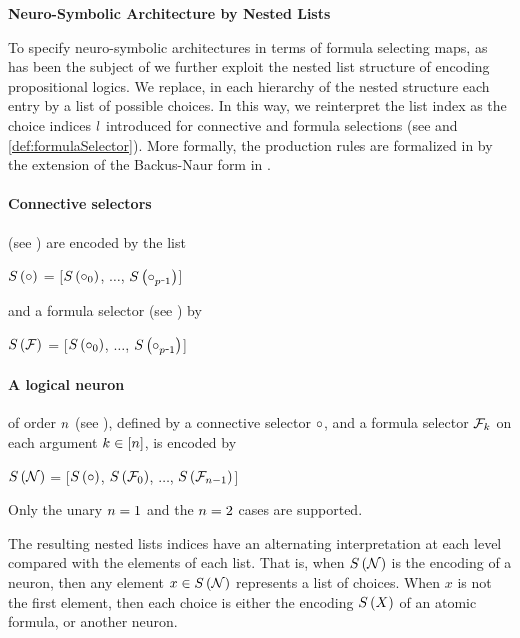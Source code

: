 \textbf{Neuro-Symbolic Architecture by Nested Lists}

To specify neuro-symbolic architectures in terms of formula selecting maps, as has been the subject of  we further exploit the nested list structure of encoding propositional logics.
We replace, in each hierarchy of the nested structure each entry by a list of possible choices.
In this way, we reinterpret the list index as the choice indices $l$ introduced for connective and formula selections (see  and \ref{def:formulaSelector}).
More formally, the production rules are formalized in  by the extension of the Backus-Naur form in .

\paragraph{Connective selectors} (see ) are encoded by the list
\begin{centeredscript}
    $S\left(\circ\right)$
			= [$S\left(\circ_{0}\right)$, $\ldots$, $\synencodingof{\exconnective_{\seldim\shortminus1}}$]
\end{centeredscript}
and a formula selector (see ) by
\begin{centeredscript}
    $S\left(\mathcal{F}\right)$
			= [$S\left(\circ_{0}\right)$, $\ldots$, $\synencodingof{\exconnective_{\seldim\shortminus1}}$]
\end{centeredscript}

\paragraph{A logical neuron} of order $n$ (see ), defined by a connective selector $\circ$, and a formula selector $\mathcal{F}_k$ on each argument $k\in[n]$, is encoded by
\begin{centeredscript}
    $S\left(\mathcal{N}\right)$
			= [$S\left(\circ\right)$, $S\left(\mathcal{F}_0\right)$, $\ldots$,  $S\left(\mathcal{F}_{n-1}\right)$]
\end{centeredscript}
Only the unary $n=1$ and the $n=2$ cases are supported.


The resulting nested lists indices have an alternating interpretation at each level compared with the elements of each list.
That is, when $S\left(\mathcal{N}\right)$ is the encoding of a neuron, then any element $x\in S\left(\mathcal{N}\right)$ represents a list of choices.
When $x$ is not the first element, then each choice is either the encoding $S\left(X\right)$ of an atomic formula, or another neuron.

